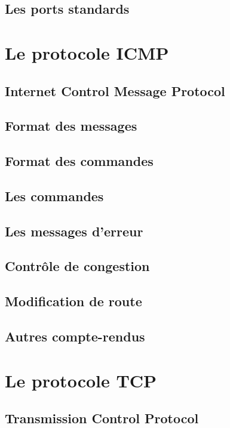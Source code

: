 \documentclass[12pt]{article}
\begin{document}
\subsection{Les ports standards}


\section{Le protocole ICMP}


\subsection{Internet Control Message Protocol}

\subsection{Format des messages}

\subsection{Format des commandes}

\subsection{Les commandes}

\subsection{Les messages d’erreur}

\subsection{Contrôle de congestion}

\subsection{Modification de route}

\subsection{Autres compte-rendus}

\section{Le protocole TCP}

\subsection{Transmission Control Protocol}
\end{document}
